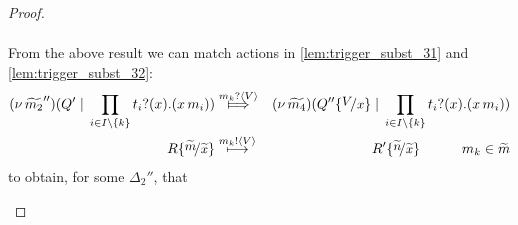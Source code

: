 \begin{proof}
\begin{enumerate}
\begin{enumerate}[i.]
\begin{eqnarray*}
							\end{eqnarray*}
							From the above result we   can
							match actions in \eqref{lem:trigger_subst_31}
							and \eqref{lem:trigger_subst_32}:
							\begin{eqnarray*}
								\newsp{\widetilde{m_2}''}{Q' \Par \prod_{i \in I\backslash{\set{k}}} \binp{t_i}{x} (\appl{x}{m_i})}
								&\Hby{\bactinp{m_k}{V}}&
								\newsp{\widetilde{m_4}}{Q'' \subst{V}{x} \Par \prod_{i \in I\backslash{\set{k}}} \binp{t_i}{x} (\appl{x}{m_i})}
								\\
								R \subst{\widetilde{m}}{\widetilde{x}}
								&\hby{\bactout{m_k}{V}}&
								R' \subst{\widetilde{n}}{\widetilde{x}} \qquad \quad m_k \in \widetilde{m}
							\end{eqnarray*}
							to obtain, for some $\Delta_2''$, that

\end{enumerate}
\end{enumerate}
\end{proof}
